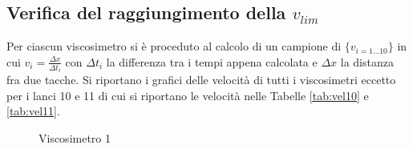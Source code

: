\documentclass[a4paper,11pt,oneside]{article}
\begin{document}
\subsection{Verifica del raggiungimento della $v_{lim}$}

Per ciascun viscosimetro si è proceduto al calcolo di un campione di $\{v_{i=1\dots 10}\}$ in cui $v_{i} = \frac{\Delta x}{\Delta t_i}$ con $\Delta t_i$ la differenza tra i tempi appena calcolata e $\Delta x$ la distanza fra due tacche. Si riportano i grafici delle velocità di tutti i viscosimetri eccetto per i lanci 10 e 11 di cui si riportano le velocità nelle Tabelle \ref{tab:vel10} e \ref{tab:vel11}.

\begin{figure}[h!]
    \centering
    \caption{Viscosimetro 1}
\end{figure}
\end{document}
